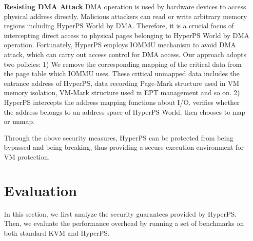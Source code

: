 \documentclass[conference]{IEEEtran}
\begin{document}
\textbf{Resisting DMA Attack}
DMA operation is used by hardware devices to access physical address directly. Malicious attackers can read or write arbitrary memory regions including HyperPS World by DMA. Therefore, it is a crucial focus of intercepting direct access to physical pages belonging to HyperPS World by DMA operation. 
Fortunately, HyperPS employs IOMMU mechanism to avoid DMA attack, which can carry out access control for DMA access. Our approach adopts two policies: 1) We remove the corresponding mapping of the critical data from the page table which IOMMU uses. These critical unmapped data includes the entrance address of HyperPS, data recording Page-Mark structure used in VM memory isolation, VM-Mark structure used in EPT management and so on. 2) HyperPS intercepts the address mapping functions about I/O, verifies whether the address belongs to an address space of HyperPS World, then chooses to map or unmap.


Through the above security measures, HyperPS can be protected from being bypassed and being breaking, thus providing a secure execution environment for VM protection.





%
%

%
%





\section{Evaluation}\label{sec:evaluation}
In this section, we first analyze the security guarantees provided by HyperPS. Then, we evaluate the performance overhead by running a set of benchmarks on both standard KVM and HyperPS.
\end{document}

